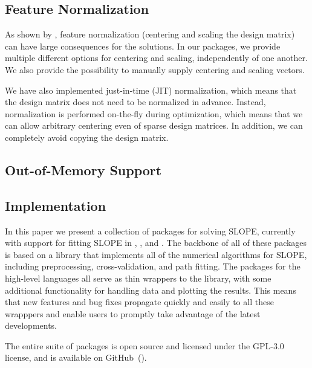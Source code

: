 \documentclass[article]{jss}
\let\Cref\crtCref
\begin{document}
\subsection{Feature Normalization}

As shown by \citet{larsson2025}, feature normalization (centering and
scaling the design matrix) can have large consequences for the
solutions. In our packages, we provide multiple different options
for centering and scaling, independently of one another.
We also provide the possibility to manually supply centering
and scaling vectors.

We have also implemented just-in-time (JIT) normalization, which
means that the design matrix does not need to be normalized
in advance. Instead, normalization is performed on-the-fly during
optimization, which means that we can allow arbitrary centering
even of sparse design matrices. In addition, we can completely
avoid copying the design matrix.

\subsection{Out-of-Memory Support}


\subsection{Implementation}

In this paper we present a collection of packages for solving SLOPE, currently
with support for fitting SLOPE in , , and
. The backbone of all of these packages is based on a
 library that implements all of the numerical algorithms for
SLOPE, including preprocessing, cross-validation, and path fitting. The
packages for the high-level languages all serve as thin wrappers to the
 library, with some additional functionality for handling data
and plotting the results. This means that new features and bug fixes propagate
quickly and easily to all these wrapppers and enable users to promptly take
advantage of the latest developments.

The entire suite of packages is open source and licensed under the GPL-3.0 license,
and is available on GitHub~(\Cref{tab:slope-packages}).
\end{document}
